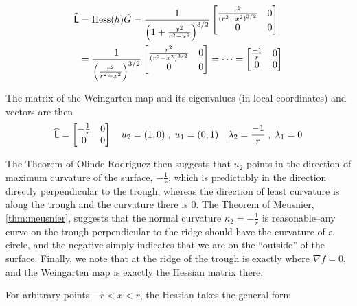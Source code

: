     \begin{align*}
  \widehat{\mathsf{L}} &= \mathrm{Hess}(h)\tilde{G}
  = \frac{1}{\left(1+\frac{x^2}{r^2-x^2}\right)^{3/2}}
  \begin{bmatrix} \frac{r^2}{\left(r^2 - x^2\right)^{3/2}} & 0 \\
  0 & 0 \end{bmatrix} \\
  &= \frac{1}{\left(\frac{r^2}{r^2-x^2}\right)^{3/2}}
  \begin{bmatrix} \frac{r^2}{\left(r^2 - x^2\right)^{3/2}} & 0 \\
  0 & 0 \end{bmatrix}
  = \cdots
  = \begin{bmatrix} \frac{-1}{r} & 0 \\ 0 & 0 \end{bmatrix}
  \end{align*}
  
The matrix of the Weingarten map and its eigenvalues (in local coordinates) and vectors are then
\begin{equation} \label{eq:trough-example-eigens}
  \widehat{\mathsf{L}} = \begin{bmatrix} - \frac{1}{r} & 0 \\ 0 & 0 	\end{bmatrix} \quad
  u_2 = (1,0) \;,\; u_1 = (0,1) \quad
  \lambda_2 = \frac{-1}{r} \;,\; \lambda_1 = 0
  \end{equation}

The Theorem of Olinde Rodriguez then suggests that $u_2$ points in the direction of maximum curvature of the surface, $-\frac{1}{r}$, which is predictably in the direction directly perpendicular to the trough, whereas the direction of least curvature is along the trough and the curvature there is $0$. The Theorem of Meusnier, \cref{thm:meusnier}, suggests that the normal curvature $\kappa_2 = -\frac{1}{r}$ is reasonable--any curve on the trough perpendicular to the ridge should have the curvature of a circle, and the negative simply indicates that we are on the ``outside'' of the surface. Finally, we note that at the ridge of the trough is exactly where $\nabla f = 0$, and the Weingarten map is exactly the Hessian matrix there.

For arbitrary points $-r < x < r$, the Hessian takes the general form

